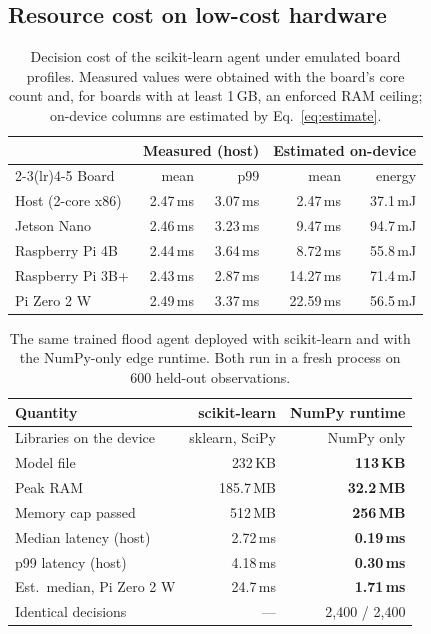 \documentclass[journal]{IEEEtran}
\begin{document}
\subsection{Resource cost on low-cost hardware}\label{sec:cost}
\begin{table}[t]
\centering
\caption{Decision cost of the scikit-learn agent under emulated board
profiles. Measured values were obtained with the board's core count and, for
boards with at least 1\,GB, an enforced RAM ceiling; on-device columns are
estimated by Eq.~\eqref{eq:estimate}.}
\label{tab:edge}
\small
\setlength{\tabcolsep}{4pt}
\begin{tabular}{@{}lrrrr@{}}
\toprule
& \multicolumn{2}{c}{Measured (host)} & \multicolumn{2}{c}{Estimated on-device} \\
\cmidrule(lr){2-3}\cmidrule(lr){4-5}
Board & mean & p99 & mean & energy \\
\midrule
Host (2-core x86) & 2.47\,ms & 3.07\,ms & 2.47\,ms & 37.1\,mJ \\
Jetson Nano       & 2.46\,ms & 3.23\,ms & 9.47\,ms & 94.7\,mJ \\
Raspberry Pi 4B   & 2.44\,ms & 3.64\,ms & 8.72\,ms & 55.8\,mJ \\
Raspberry Pi 3B+  & 2.43\,ms & 2.87\,ms & 14.27\,ms & 71.4\,mJ \\
Pi Zero 2 W       & 2.49\,ms & 3.37\,ms & 22.59\,ms & 56.5\,mJ \\
\bottomrule
\end{tabular}
\end{table}

\begin{table}[t]
\centering
\caption{The same trained flood agent deployed with scikit-learn and with the
NumPy-only edge runtime. Both run in a fresh process on 600 held-out
observations.}
\label{tab:runtime}
\small
\setlength{\tabcolsep}{4pt}
\begin{tabular}{@{}lrr@{}}
\toprule
Quantity & scikit-learn & \textbf{NumPy runtime} \\
\midrule
Libraries on the device & sklearn, SciPy & NumPy only \\
Model file             & 232\,KB  & \textbf{113\,KB} \\
Peak RAM               & 185.7\,MB & \textbf{32.2\,MB} \\
Memory cap passed      & 512\,MB & \textbf{256\,MB} \\
Median latency (host)  & 2.72\,ms & \textbf{0.19\,ms} \\
p99 latency (host)     & 4.18\,ms & \textbf{0.30\,ms} \\
Est.\ median, Pi Zero 2 W & 24.7\,ms & \textbf{1.71\,ms} \\
Identical decisions    & --- & 2{,}400 / 2{,}400 \\
\bottomrule
\end{tabular}
\end{table}
\end{document}
